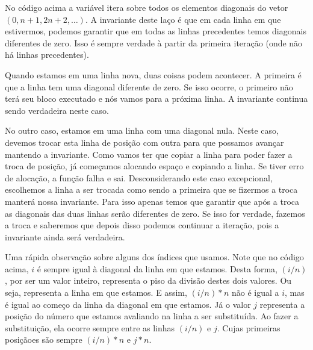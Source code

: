 
No código acima a variável  itera sobre todos os
elementos diagonais do vetor $(0, n+1, 2n+2, \ldots)$. A invariante
deste laço é que em cada linha em que estivermos, podemos garantir que
em todas as linhas precedentes temos diagonais diferentes de
zero. Isso é sempre verdade à partir da primeira iteração (onde não há
linhas precedentes).

Quando estamos em uma linha nova, duas coisas podem acontecer. A
primeira é que a linha tem uma diagonal diferente de zero. Se isso
ocorre, o primeiro  não terá seu bloco executado e nós
vamos para a próxima linha. A invariante continua sendo verdadeira
neste caso.

No outro caso, estamos em uma linha com uma diagonal nula. Neste caso,
devemos trocar esta linha de posição com outra para que possamos
avançar mantendo a invariante. Como vamos ter que copiar a linha para
poder fazer a troca de posição, já começamos alocando espaço e
copiando a linha. Se tiver erro de alocação, a função falha e
sai. Desconsiderando este caso excepcional, escolhemos a linha a ser
trocada como sendo a primeira que se fizermos a troca manterá nossa
invariante. Para isso apenas temos que garantir que após a troca as
diagonais das duas linhas serão diferentes de zero. Se isso for
verdade, fazemos a troca e saberemos que depois disso podemos
continuar a iteração, pois a invariante ainda será verdadeira.

Uma rápida observação sobre alguns dos índices que usamos. Note que no
código acima, $i$ é sempre igual à diagonal da linha em que
estamos. Desta forma, $(i/n)$, por ser um valor inteiro, representa o
piso da divisão destes dois valores. Ou seja, representa a linha em
que estamos. E assim, $(i/n)*n$ não é igual a $i$, mas é igual ao
começo da linha da diagonal em que estamos. Já o valor $j$ representa
a posição do número que estamos avaliando na linha a ser
substituída. Ao fazer a substituição, ela ocorre sempre entre as
linhas $(i/n)$ e $j$. Cujas primeiras posiçãoes são sempre $(i/n)*n$
e $j*n$.


